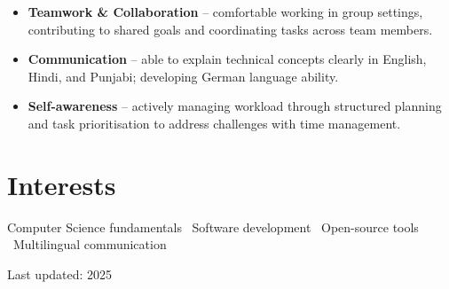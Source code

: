 \documentclass[a4paper,10pt]{article}
\begin{document}
\begin{itemize}[leftmargin=*, itemsep=2pt]
  \item \textbf{Teamwork \& Collaboration} -- comfortable working in group settings,
        contributing to shared goals and coordinating tasks across team members.
  \item \textbf{Communication} -- able to explain technical concepts clearly in
        English, Hindi, and Punjabi; developing German language ability.
  \item \textbf{Self-awareness} -- actively managing workload through structured
        planning and task prioritisation to address challenges with time management.
\end{itemize}

\section{Interests}

Computer Science fundamentals \textbullet\ Software development \textbullet\
Open-source tools \textbullet\ Multilingual communication

\vfill
{\footnotesize\color{muted} Last updated: 2025}
\end{document}
